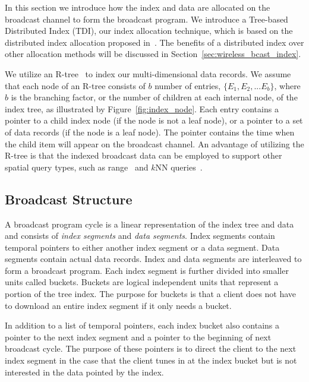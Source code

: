 
In this section we introduce how the index and data are allocated
on the broadcast channel to form the broadcast program. We
introduce a Tree-based Distributed Index (TDI), our index
allocation technique, which is based on the distributed index
allocation proposed in~\cite{journals/tkde/ImielinskiVB97}. The
benefits of a distributed index over other allocation methods will
be discussed in Section~\ref{sec:wireless_bcast_index}.

We utilize an R-tree~\cite{conf/sigmod/Guttman84} to index our
multi-dimensional data records. We assume that each node of an
R-tree consists of $b$ number of entries, $\{E_1, E_2, ... E_b\}$,
where $b$ is the branching factor, or the number of children at
each internal node, of the index tree, as illustrated by
Figure~\ref{fig:index_node}. Each entry contains a pointer to a
child index node (if the node is not a leaf node), or a pointer to
a set of data records (if the node is a leaf node). The pointer
contains the time when the child item will appear on the broadcast
channel. An advantage of utilizing the R-tree is that the indexed
broadcast data can be employed to support other spatial query
types, such as range~\cite{conf/pods/PagelSTW93} and $k$NN
queries~\cite{journals/tods/HjaltasonS99}.

\subsection{Broadcast Structure}

A broadcast program cycle is a linear representation of the index
tree and data and consists of \emph{index segments} and \emph{data
segments}. Index segments contain temporal pointers to either
another index segment or a data segment. Data segments contain
actual data records. Index and data segments are interleaved to
form a broadcast program. Each index segment is further divided
into smaller units called buckets. Buckets are logical independent
units that represent a portion of the tree index. The purpose for
buckets is that a client does not have to download an entire index
segment if it only needs a bucket.

In addition to a list of temporal pointers, each index bucket also
contains a pointer to the next index segment and a pointer to the
beginning of next broadcast cycle. The purpose of these pointers
is to direct the client to the next index segment in the case that
the client tunes in at the index bucket but is not interested in
the data pointed by the index.

